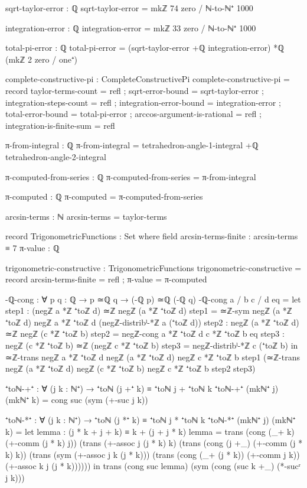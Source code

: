 \documentclass[11pt,a4paper]{book}
\begin{document}
\begin{code}
sqrt-taylor-error : ℚ
sqrt-taylor-error = mkℤ 74 zero / ℕ-to-ℕ⁺ 1000

integration-error : ℚ
integration-error = mkℤ 33 zero / ℕ-to-ℕ⁺ 1000

total-pi-error : ℚ
total-pi-error = (sqrt-taylor-error +ℚ integration-error) *ℚ (mkℤ 2 zero / one⁺)

complete-constructive-pi : CompleteConstructivePi
complete-constructive-pi = record
  { taylor-terms-count = refl
  ; sqrt-error-bound = sqrt-taylor-error
  ; integration-steps-count = refl
  ; integration-error-bound = integration-error
  ; total-error-bound = total-pi-error
  ; arccos-argument-is-rational = refl
  ; integration-is-finite-sum = refl
  }

π-from-integral : ℚ
π-from-integral = tetrahedron-angle-1-integral +ℚ tetrahedron-angle-2-integral

π-computed-from-series : ℚ
π-computed-from-series = π-from-integral

π-computed : ℚ
π-computed = π-computed-from-series

arcsin-terms : ℕ
arcsin-terms = taylor-terms

record TrigonometricFunctions : Set where
  field
    arcsin-terms-finite : arcsin-terms ≡ 7
    π-value : ℚ

trigonometric-constructive : TrigonometricFunctions
trigonometric-constructive = record
  { arcsin-terms-finite = refl
  ; π-value = π-computed
  }

-ℚ-cong : ∀ {p q : ℚ} → p ≃ℚ q → (-ℚ p) ≃ℚ (-ℚ q)
-ℚ-cong {a / b} {c / d} eq = 
  let step1 : (negℤ a *ℤ ⁺toℤ d) ≃ℤ negℤ (a *ℤ ⁺toℤ d)
      step1 = ≃ℤ-sym {negℤ (a *ℤ ⁺toℤ d)} {negℤ a *ℤ ⁺toℤ d} (negℤ-distribˡ-*ℤ a (⁺toℤ d))
      step2 : negℤ (a *ℤ ⁺toℤ d) ≃ℤ negℤ (c *ℤ ⁺toℤ b)
      step2 = negℤ-cong {a *ℤ ⁺toℤ d} {c *ℤ ⁺toℤ b} eq
      step3 : negℤ (c *ℤ ⁺toℤ b) ≃ℤ (negℤ c *ℤ ⁺toℤ b)
      step3 = negℤ-distribˡ-*ℤ c (⁺toℤ b)
  in ≃ℤ-trans {negℤ a *ℤ ⁺toℤ d} {negℤ (a *ℤ ⁺toℤ d)} {negℤ c *ℤ ⁺toℤ b}
       step1 (≃ℤ-trans {negℤ (a *ℤ ⁺toℤ d)} {negℤ (c *ℤ ⁺toℤ b)} {negℤ c *ℤ ⁺toℤ b} step2 step3)

⁺toℕ-+⁺ : ∀ (j k : ℕ⁺) → ⁺toℕ (j +⁺ k) ≡ ⁺toℕ j + ⁺toℕ k
⁺toℕ-+⁺ (mkℕ⁺ j) (mkℕ⁺ k) = cong suc (sym (+-suc j k))

⁺toℕ-*⁺ : ∀ (j k : ℕ⁺) → ⁺toℕ (j *⁺ k) ≡ ⁺toℕ j * ⁺toℕ k
⁺toℕ-*⁺ (mkℕ⁺ j) (mkℕ⁺ k) = 
  let
    lemma : (j * k + j + k) ≡ k + (j + j * k)
    lemma = trans (cong (_+ k) (+-comm (j * k) j))
            (trans (+-assoc j (j * k) k)
            (trans (cong (j +_) (+-comm (j * k) k))
            (trans (sym (+-assoc j k (j * k)))
            (trans (cong (_+ (j * k)) (+-comm j k))
            (+-assoc k j (j * k))))))
  in trans (cong suc lemma) (sym (cong (suc k +_) (*-sucʳ j k)))


\end{code}
\end{document}
